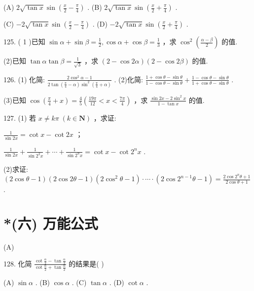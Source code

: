 \documentclass[10pt]{article}
\newcommand*\circled[1]{\tikz[baseline=(char.base)]{\node[shape=circle,draw,inner sep=1.5pt] (char) {\small #1};}}
\begin{document}
(A) \(2\sqrt{\tan x}\sin \left( {\frac{x}{2} - \frac{\pi }{4}}\right)\) . (B) \(2\sqrt{\tan x}\sin \left( {\frac{x}{2} + \frac{\pi }{4}}\right)\) .

(C) \(- 2\sqrt{\tan x}\sin \left( {\frac{x}{2} - \frac{\pi }{4}}\right)\) . (D) \(- 2\sqrt{\tan x}\sin \left( {\frac{x}{2} + \frac{\pi }{4}}\right)\) .

125. ( 1 )已知 \(\sin \alpha  + \sin \beta  = \frac{1}{2},\cos \alpha  + \cos \beta  = \frac{1}{3}\) ，求 \({\cos }^{2}\left( \frac{\alpha  - \beta }{2}\right)\) 的值.

(2)已知 \(\tan \alpha \tan \beta  = \frac{1}{\sqrt{3}}\) ，求 \(\left( {2 - \cos {2\alpha }}\right) \left( {2 - \cos {2\beta }}\right)\) 的值.

126. (1) 化简: \(\frac{2{\cos }^{2}\alpha  - 1}{2\tan \left( {\frac{\pi }{4} - \alpha }\right) {\sin }^{2}\left( {\frac{\pi }{4} + \alpha }\right) }\) . (2)化简: \(\frac{1 + \cos \theta  - \sin \theta }{1 - \cos \theta  - \sin \theta } + \frac{1 - \cos \theta  - \sin \theta }{1 + \cos \theta  - \sin \theta }\) .

(3)已知 \(\cos \left( {\frac{\pi }{4} + x}\right)  = \frac{4}{5}\left( {\frac{19\pi }{12} < x < \frac{7\pi }{4}}\right)\) ，求 \(\frac{\sin {2x} - 2{\sin }^{2}x}{1 - \tan x}\) 的值.

127. (1) 若 \(x \neq  {k\pi }\;\left( {k \in  \mathbf{N}}\right)\) ，求证:

 \circled{1}  \(\frac{1}{\sin {2x}} = \cot x - \cot {2x}\) ；

 \circled{2}  \(\frac{1}{\sin {2x}} + \frac{1}{\sin {2}^{2}x} + \cdots  + \frac{1}{\sin {2}^{n}x} = \cot x - \cot {2}^{n}x\) .

(2)求证: \(\left( {2\cos \theta  - 1}\right) \left( {2\cos {2\theta } - 1}\right) \left( {2{\cos }^{2}\theta  - 1}\right)  \cdot  \cdots  \cdot  \left( {2\cos {2}^{n - 1}\theta  - 1}\right)  = \frac{2\cos {2}^{n}\theta  + 1}{2\cos \theta  + 1}\) .

\section*{*(六) 万能公式}

(A)

128. 化简 \(\frac{\cot \frac{\alpha }{2} - \tan \frac{\alpha }{2}}{\cot \frac{\alpha }{2} + \tan \frac{\alpha }{2}}\) 的结果是( )

(A) \(\sin \alpha\) . (B) \(\cos \alpha\) . (C) \(\tan \alpha\) . (D) \(\cot \alpha\) .
\end{document}
